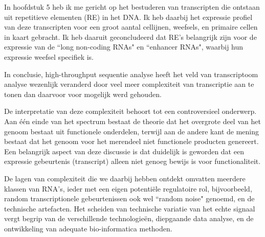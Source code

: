 In hoofdstuk 5 heb ik me gericht op het bestuderen van transcripten die ontstaan uit repetitieve elementen (RE) in het DNA. Ik heb daarbij het expressie profiel van deze transcripten voor een groot aantal cellijnen, weefsels, en primaire cellen in kaart gebracht. Ik heb daaruit geconcludeerd dat RE's belangrijk zijn voor de expressie van de ``long non-coding RNAs" en ``enhancer RNAs", waarbij hun expressie weefsel specifiek is.

In conclusie, high-throughput sequentie analyse heeft het veld van transcriptoom analyse wezenlijk veranderd door veel meer complexiteit van transcriptie aan te tonen dan daarvoor voor mogelijk werd gehouden.

De interpretatie van deze complexiteit behoort tot een controversieel onderwerp. Aan één einde van het spectrum bestaat de theorie dat het overgrote deel van het genoom bestaat uit functionele  onderdelen, terwijl aan de andere kant de mening bestaat dat het genoom voor het merendeel niet functionele producten genereert. Een belangrijk aspect van deze discussie is dat duidelijk is geworden dat een expressie gebeurtenis (transcript) alleen niet genoeg bewijs is voor functionaliteit.

De lagen van complexiteit die we daarbij hebben ontdekt omvatten meerdere klassen van RNA's, ieder met een eigen potentiële regulatoire rol, bijvoorbeeld, random transcriptionele gebeurtenissen ook wel ``random noise" genoemd, en de technische artefacten. Het scheiden van technische variatie van het echte signaal vergt begrip van de verschillende technologieën, diepgaande data analyse, en de ontwikkeling van adequate bio-informatica methoden.
